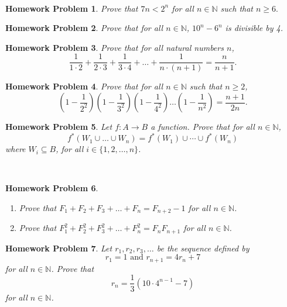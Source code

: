 \documentclass{article}
\newtheorem{hw}{Homework Problem}
\newcommand{\N}{\mathbb{N}}
\newcommand{\be}{\begin{enumerate}}
\newcommand{\ee}{\end{enumerate}}
\begin{document}
	\
	\begin{hw}
		Prove that $7n<2^n$ for all $n \in \N$ such that $n \geq 6.$
	\end{hw}
	\begin{hw}
		Prove that for all $n \in \mathbb{N}$, $10^n - 6^n$ is divisible by 4.
	\end{hw}
	\begin{hw}
		Prove that for all natural numbers $n$, $$ \frac{1}{1\cdot 2} + \frac{1}{2\cdot 3} +\frac{1}{3\cdot 4} + \dots + \frac{1}{n\cdot (n+1)} = \frac{n}{n+1}.$$
	\end{hw}
	\begin{hw}
		Prove that for all $n \in \N$ such that $n\geq 2$, $$(1-\frac{1}{2^2})(1-\frac{1}{3^2})(1-\frac{1}{4^2}) \dots (1-\frac{1}{n^2}) = \frac{n+1}{2n}.$$
	\end{hw}
	\begin{hw}
		Let $f:A \rightarrow B$ a function.
		Prove that for all $n \in \N$, $$f^*(W_1 \cup \ldots \cup W_n) =f^*(W_1) \cup \cdots \cup f^*(W_n)$$
		where $W_i \subseteq B$, for all $i \in \{ 1, 2, \dots, n\}$.
	\end{hw}



	\underline{\hspace{5in}}


	\
	\begin{hw}
		\be
		\item Prove that $F_1 + F_2 + F_3 + \dots + F_n = F_{n+2}-1$ for all $n \in \N$.
		\item Prove that $F_1^2 + F_2^2 + F_3^2 + \dots + F_n^2 = F_nF_{n+1}$ for all $n \in \N$.
		\ee
	\end{hw}
	\begin{hw}
		Let $r_1, r_2, r_3, \dots$ be the sequence defined by $$r_1 = 1 \textrm{ \  and  \ } r_{n+1} = 4r_n+7$$ for all $n \in \N$. Prove that $$r_n = \frac{1}{3} (10 \cdot 4^{n-1} -7 )$$ for all $n\in \N$.
	\end{hw}

	\underline{\hspace{5in}}
\end{document}
